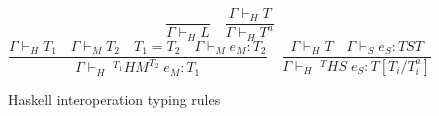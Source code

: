 \begin{figure}
\[
\frac{}{\Gamma\vdash_{H}L}
\quad
\frac{\Gamma\vdash_{H}T}{\Gamma\vdash_{H}T^{a}}
\]
\bigskip
\[
\frac{\Gamma\vdash_{H}T_{1}\quad\Gamma\vdash_{M}T_{2}\quad T_{1}=T_{2}\quad\Gamma\vdash_{M}e_{M}:T_{2}}{\Gamma\vdash_{H}\;^{T_{1}}HM^{T_{2}}\;e_{M}:T_{1}}
\quad
\frac{\Gamma\vdash_{H}T\quad\Gamma\vdash_{S}e_{S}:TST}{\Gamma\vdash_{H}\;^{T}HS\;e_{S}:T[T_{i}/T^{a}_{i}]}
\]
\caption{Haskell interoperation typing rules}
\label{hitr}
\end{figure}